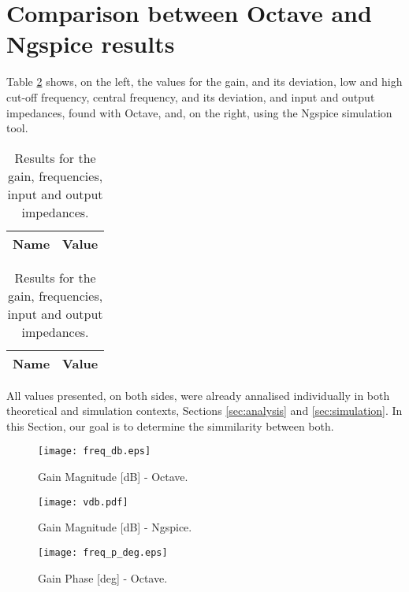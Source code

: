\section{Comparison between Octave and Ngspice results}
\label{sec:comparison}
\par Table \ref{tab:results_compar} shows, on the left, the values for the gain, and its deviation,
low and high cut-off frequency, central frequency, and its deviation, and input and output impedances,
found with Octave, and, on the right, using the Ngspice simulation tool.

\begin{table}[H]
  \centering
  \begin{tabular}{|l|r|}
      \hline    
      {\bf Name} & {\bf Value} \\ \hline
      
      
      
      
  \end{tabular}
\quad
  \begin{tabular}{|l|r|}
    \hline    
    {\bf Name} & {\bf Value} \\ \hline
    
    
    
    
    
  \end{tabular}
  \caption{Results for the gain, frequencies, input and output impedances.}
  \label{tab:results_compar}
\end{table}

\par All values presented, on both sides, were already annalised individually in both theoretical and
simulation contexts, Sections \ref{sec:analysis} and \ref{sec:simulation}. In this Section, our goal
is to determine the simmilarity between both.

\begin{figure}[H] \centering
  \texttt{[image: freq\_db.eps]}
  \caption{Gain Magnitude [dB] - Octave.}
  \label{fig:gain_compar}
\end{figure}

\begin{figure}[H] \centering
  \texttt{[image: vdb.pdf]}
  \caption{Gain Magnitude [dB] - Ngspice.}
  \label{fig:vdb_compar}
\end{figure}


\begin{figure}[H] \centering
  \texttt{[image: freq\_p\_deg.eps]}
  \caption{Gain Phase [deg] - Octave.}
  \label{fig:phase_compar}
\end{figure}


